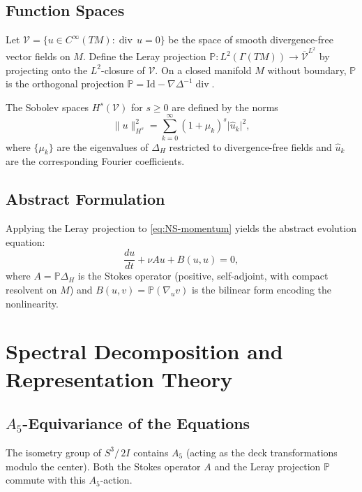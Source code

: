 \documentclass[11pt,a4paper]{article}
\theoremstyle{plain}
\theoremstyle{definition}
\DeclareMathOperator{\dv}{div}
\newcommand{\Lap}{\Delta}                 %
\newcommand{\DS}{S^3\!/\,2I}             %
\newcommand{\norm}[1]{\lVert #1 \rVert}
\newcommand{\abs}[1]{\lvert #1 \rvert}
\begin{document}
\subsection{Function Spaces}

Let $\mathcal{V} = \{ u \in C^\infty(TM) : \dv\, u = 0 \}$ be the space of
smooth divergence-free vector fields on $M$.  Define the Leray projection
$\mathbb{P} : L^2(\Gamma(TM)) \to \overline{\mathcal{V}}^{L^2}$ by
projecting onto the $L^2$-closure of $\mathcal{V}$.  On a closed manifold $M$
without boundary, $\mathbb{P}$ is the orthogonal projection
$\mathbb{P} = \mathrm{Id} - \nabla \Lap^{-1} \dv$.

The Sobolev spaces $H^s(\mathcal{V})$ for $s \ge 0$ are defined by the norms
\[
  \norm{u}_{H^s}^2 = \sum_{k=0}^\infty (1 + \mu_k)^s \abs{\hat{u}_k}^2,
\]
where $\{\mu_k\}$ are the eigenvalues of $\Lap_H$ restricted to
divergence-free fields and $\hat{u}_k$ are the corresponding Fourier
coefficients.

\subsection{Abstract Formulation}

Applying the Leray projection to \eqref{eq:NS-momentum} yields the abstract
evolution equation:
\begin{equation}\label{eq:NS-abstract}
  \frac{du}{dt} + \nu A u + B(u, u) = 0,
\end{equation}
where $A = \mathbb{P} \Lap_H$ is the Stokes operator (positive, self-adjoint,
with compact resolvent on $M$) and $B(u,v) = \mathbb{P}(\nabla_u v)$ is the
bilinear form encoding the nonlinearity.

\section{Spectral Decomposition and Representation Theory}\label{sec:spectral}

\subsection{$A_5$-Equivariance of the Equations}

The isometry group of $\DS$ contains $A_5$ (acting as the deck
transformations modulo the center).  Both the Stokes operator $A$ and the
Leray projection $\mathbb{P}$ commute with this $A_5$-action.
\end{document}
